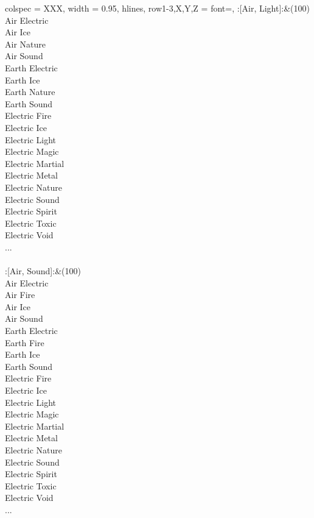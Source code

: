 \begin{longtblr}[
	caption = {2v2 Defending Weak},
	label = {2v2-Defending-Weak},
]{
	colspec = {XXX}, width = 0.95\linewidth,
	hlines,
	row{1-3,X,Y,Z} = {font=\bfseries},
}
	:[Air, Light]:&{(100)\\
	Air Electric \\
	Air Ice \\
	Air Nature \\
	Air Sound \\
	Earth Electric \\
	Earth Ice \\
	Earth Nature \\
	Earth Sound \\
	Electric Fire \\
	Electric Ice \\
	Electric Light \\
	Electric Magic \\
	Electric Martial \\
	Electric Metal \\
	Electric Nature \\
	Electric Sound \\
	Electric Spirit \\
	Electric Toxic \\
	Electric Void \\
	...\\
	}\\

	:[Air, Sound]:&{(100)\\
	Air Electric \\
	Air Fire \\
	Air Ice \\
	Air Sound \\
	Earth Electric \\
	Earth Fire \\
	Earth Ice \\
	Earth Sound \\
	Electric Fire \\
	Electric Ice \\
	Electric Light \\
	Electric Magic \\
	Electric Martial \\
	Electric Metal \\
	Electric Nature \\
	Electric Sound \\
	Electric Spirit \\
	Electric Toxic \\
	Electric Void \\
	...\\
	}\\


\end{longtblr}
